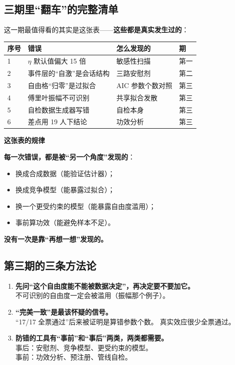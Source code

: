 \documentclass[UTF8,a4paper,11pt]{ctexart}
\newenvironment{explainbox}[1]
{\begin{center}\begin{minipage}{0.94\textwidth}\colorbox{boxbg}{\parbox{0.92\textwidth}{\textbf{#1}\par\vspace{2pt}}}}
{\end{minipage}\end{center}}
\begin{document}
\subsection{三期里“翻车”的完整清单}

这一期最值得看的其实是这张表——\textbf{这些都是真实发生过的}：

\begin{longtable}{@{}p{1.0cm}p{5.4cm}p{4.4cm}p{3.0cm}@{}}
\toprule
\textbf{序号} & \textbf{错误} & \textbf{怎么发现的} & \textbf{期} \\
\midrule
1 & $\eta$ 默认值偏大 15 倍 & 敏感性扫描 & 第一 \\
2 & 事件层的“自激”是会话结构 & 三路安慰剂 & 第二 \\
3 & 自由格“归零”是过拟合 & AIC 参数个数对照 & 第三 \\
4 & 傅里叶振幅不可识别 & 共享拟合发散 & 第三 \\
5 & 自检数据生成器写错 & 自检本身 & 第三 \\
6 & 差点用 19 人下结论 & 功效分析 & 第三 \\
\bottomrule
\end{longtable}

\begin{explainbox}{这张表的规律}
\textbf{每一次错误，都是被“另一个角度”发现的}：
\begin{itemize}[leftmargin=1.4em,itemsep=1pt]
\item 换成合成数据（能验证估计器）；
\item 换成竞争模型（能暴露过拟合）；
\item 换一个更受约束的模型（能暴露自由度滥用）；
\item 事前算功效（能避免样本不足）。
\end{itemize}
\textbf{没有一次是靠“再想一想”发现的。}
\end{explainbox}

\subsection{第三期的三条方法论}

\begin{enumerate}[leftmargin=2em]
\item \textbf{先问“这个自由度能不能被数据决定”，再决定要不要加它。}\\
      不可识别的自由度一定会被滥用（振幅那个例子）。

\item \textbf{“完美一致”是最该怀疑的信号。}\\
      “17/17 全票通过”后来被证明是算错参数个数。
      真实效应很少全票通过。

\item \textbf{防错的工具有“事前”和“事后”两类，两类都需要。}\\
      事后：安慰剂、竞争模型、更受约束的模型。\\
      事前：功效分析、预注册、管线自检。
\end{enumerate}
\end{document}
